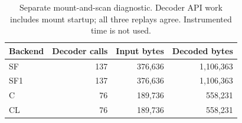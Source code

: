 \begin{table}[h]\centering\small
\caption{Separate mount-and-scan diagnostic. Decoder API work includes mount startup; all three replays agree. Instrumented time is not used.}
\begin{tabular}{lrrr}\toprule Backend & Decoder calls & Input bytes & Decoded bytes \\\midrule
SF & 137 & 376,636 & 1,106,363 \\
SF1 & 137 & 376,636 & 1,106,363 \\
C & 76 & 189,736 & 558,231 \\
CL & 76 & 189,736 & 558,231 \\
\bottomrule\end{tabular}\end{table}
